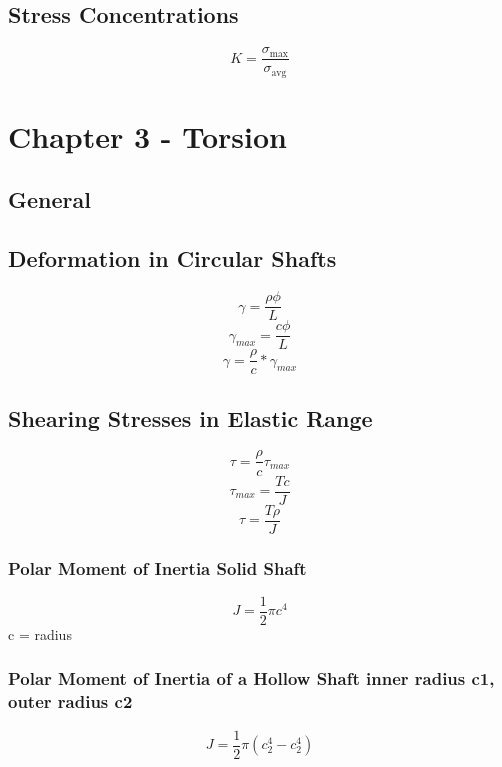 \documentclass[10pt,landscape]{article}
\begin{document}
\begin{multicols}{3}
\subsection{Stress Concentrations}
\begin{equation}
    K=\frac{\sigma_\text{max}}{\sigma_\text{avg}}
\end{equation}

\section{Chapter 3 - Torsion}
\subsection{General}
\subsection{Deformation in Circular Shafts}
\begin{equation}
    \gamma=\frac{\rho\phi}{L}
\end{equation}
\begin{equation}
    \gamma_{max}=\frac{c\phi}{L}
\end{equation}
\begin{equation}
    \gamma=\frac{\rho}{c}*\gamma_{max}
\end{equation}
\subsection{Shearing Stresses in Elastic Range}
\begin{equation}
    \tau=\frac{\rho}{c}\tau_{max}
\end{equation}
\begin{equation}
    \tau_{max}=\frac{Tc}{J}
\end{equation}
\begin{equation}
    \tau=\frac{T\rho}{J}
\end{equation}
\subsubsection{Polar Moment of Inertia Solid Shaft}
\begin{equation}
    J=\frac{1}{2}\pi c^4
\end{equation}
c = radius
\subsubsection{Polar Moment of Inertia of a Hollow Shaft inner radius c1, outer radius c2}
\begin{equation}
    J=\frac{1}{2}\pi(c_2^4-c_2^4)
\end{equation}

\end{multicols}
\end{document}
